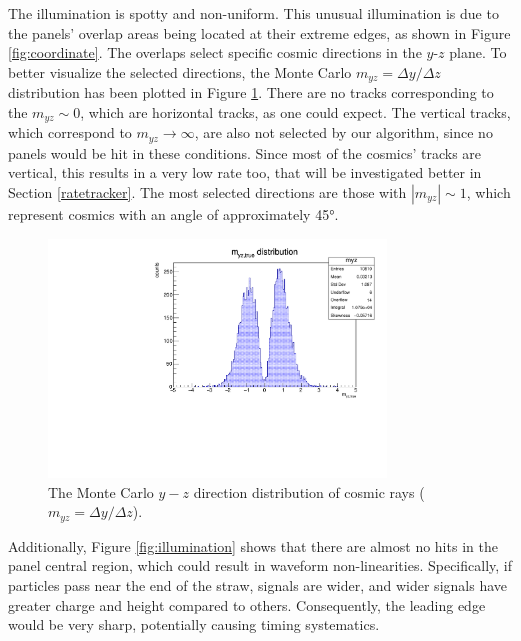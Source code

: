 The illumination is spotty and non-uniform. This unusual illumination is due to the panels' overlap areas being located at their extreme edges, as shown in Figure \ref{fig:coordinate}. 
The overlaps select specific cosmic directions in the $y$-$z$ plane. 
To better visualize the selected directions, the Monte Carlo $m_{yz}=\Delta y /\Delta z$ distribution has been plotted in Figure \ref{fig:myz}.
There are no tracks corresponding to the $m_{yz}\sim 0$, which are horizontal tracks, as one could expect. The vertical tracks, 
which correspond to $m_{yz} \rightarrow \infty$, are also not selected by our algorithm, since no panels would be hit in these conditions. Since most of the cosmics' tracks are vertical, 
this results in a very low rate too, that will be investigated better in Section \ref{ratetracker}. The most selected directions are those with $|m_{yz}| \sim 1$, which represent cosmics with 
an angle of approximately 45°.
\begin{figure}[!h]
    \centering
    \includegraphics[width =0.8\textwidth]{figures/pdf/myz.pdf}
    \caption{The Monte Carlo $y-z$ direction distribution of cosmic rays ($m_{yz}=\Delta y /\Delta z$).}
    \label{fig:myz}
\end{figure}

Additionally, Figure \ref{fig:illumination} shows that there are almost no hits in the panel central region, which could result in waveform non-linearities.
Specifically, if particles pass near the end of the straw, signals are wider, and wider signals have greater charge and 
height compared to others. Consequently, the leading edge would be very sharp, potentially causing timing systematics.

